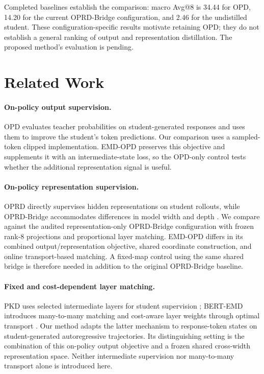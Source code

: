 \documentclass[10pt,twocolumn]{article}
\newcommand{\method}{\textsc{EMD-OPD}}
\begin{document}
Completed baselines establish the comparison: macro Avg@8 is 34.44 for OPD, 14.20 for the current OPRD-Bridge configuration, and 2.46 for the undistilled student. These configuration-specific results motivate retaining OPD; they do not establish a general ranking of output and representation distillation. The proposed method's evaluation is pending.

\section{Related Work}

\paragraph{On-policy output supervision.}
OPD evaluates teacher probabilities on student-generated responses and uses them to improve the student's token predictions. Our comparison uses a sampled-token clipped implementation. \method{} preserves this objective and supplements it with an intermediate-state loss, so the OPD-only control tests whether the additional representation signal is useful.

\paragraph{On-policy representation supervision.}
OPRD directly supervises hidden representations on student rollouts, while OPRD-Bridge accommodates differences in model width and depth \cite{yang2026oprd}. We compare against the audited representation-only OPRD-Bridge configuration with frozen rank-8 projections and proportional layer matching. \method{} differs in its combined output/representation objective, shared coordinate construction, and online transport-based matching. A fixed-map control using the same shared bridge is therefore needed in addition to the original OPRD-Bridge baseline.

\paragraph{Fixed and cost-dependent layer matching.}
PKD uses selected intermediate layers for student supervision \cite{sun2019pkd}; BERT-EMD introduces many-to-many matching and cost-aware layer weights through optimal transport \cite{li2020bertemd}. Our method adapts the latter mechanism to response-token states on student-generated autoregressive trajectories. Its distinguishing setting is the combination of this on-policy output objective and a frozen shared cross-width representation space. Neither intermediate supervision nor many-to-many transport alone is introduced here.
\end{document}
